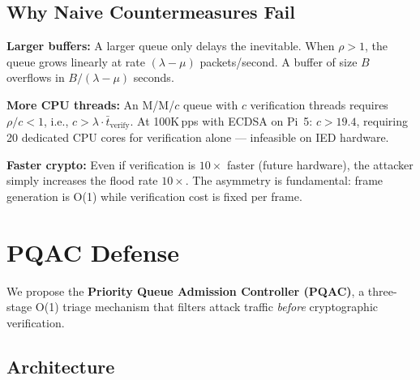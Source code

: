 \documentclass[11pt,a4paper]{article}
\begin{document}
\subsection{Why Naive Countermeasures Fail}

\textbf{Larger buffers:} A larger queue only delays the inevitable. When $\rho > 1$, the queue grows linearly at rate $(\lambda - \mu)$ packets/second. A buffer of size $B$ overflows in $B/(\lambda - \mu)$ seconds.

\textbf{More CPU threads:} An M/M/$c$ queue with $c$ verification threads requires $\rho/c < 1$, i.e., $c > \lambda \cdot \bar{t}_{\text{verify}}$. At 100K\,pps with ECDSA on Pi~5: $c > 19.4$, requiring 20 dedicated CPU cores for verification alone --- infeasible on IED hardware.

\textbf{Faster crypto:} Even if verification is $10\times$ faster (future hardware), the attacker simply increases the flood rate $10\times$. The asymmetry is fundamental: frame generation is O(1) while verification cost is fixed per frame.

\section{PQAC Defense}
\label{sec:defense}

We propose the \textbf{Priority Queue Admission Controller (PQAC)}, a three-stage O(1) triage mechanism that filters attack traffic \emph{before} cryptographic verification.

\subsection{Architecture}
\end{document}
